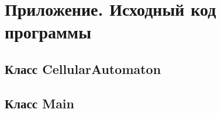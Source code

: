 \newpage
\section*{Приложение. Исходный код программы}
\label{app:code}

\subsection*{Класс CellularAutomaton}


\subsection*{Класс Main}

